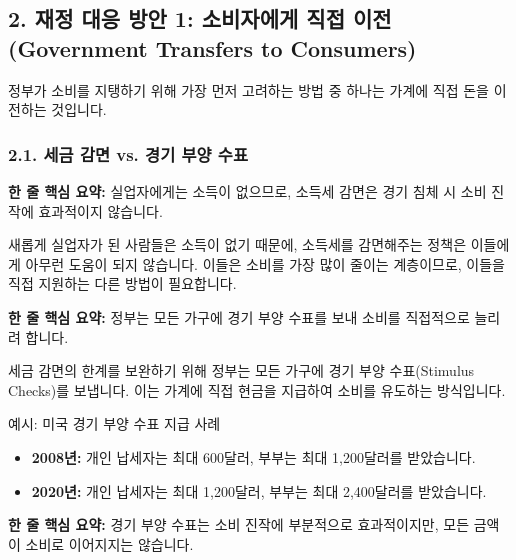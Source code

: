 \documentclass[11pt,a4paper]{article}
\begin{document}
\subsection*{2. 재정 대응 방안 1: 소비자에게 직접 이전 (Government Transfers to Consumers)}

정부가 소비를 지탱하기 위해 가장 먼저 고려하는 방법 중 하나는 가계에 직접 돈을 이전하는 것입니다.

\subsubsection*{2.1. 세금 감면 vs. 경기 부양 수표}

\begin{tcolorbox}[mybox={세금 감면의 한계}]
    \textbf{한 줄 핵심 요약:} 실업자에게는 소득이 없으므로, 소득세 감면은 경기 침체 시 소비 진작에 효과적이지 않습니다.
\end{tcolorbox}

새롭게 실업자가 된 사람들은 소득이 없기 때문에, 소득세를 감면해주는 정책은 이들에게 아무런 도움이 되지 않습니다. 이들은 소비를 가장 많이 줄이는 계층이므로, 이들을 직접 지원하는 다른 방법이 필요합니다.

\begin{tcolorbox}[mybox={경기 부양 수표의 도입}]
    \textbf{한 줄 핵심 요약:} 정부는 모든 가구에 경기 부양 수표를 보내 소비를 직접적으로 늘리려 합니다.
\end{tcolorbox}

세금 감면의 한계를 보완하기 위해 정부는 모든 가구에 경기 부양 수표(Stimulus Checks)를 보냅니다. 이는 가계에 직접 현금을 지급하여 소비를 유도하는 방식입니다.

\begin{examplebox}{예시: 미국 경기 부양 수표 지급 사례}
    \begin{itemize}
        \item \textbf{2008년:} 개인 납세자는 최대 600달러, 부부는 최대 1,200달러를 받았습니다.
        \item \textbf{2020년:} 개인 납세자는 최대 1,200달러, 부부는 최대 2,400달러를 받았습니다.
    \end{itemize}
\end{examplebox}

\begin{tcolorbox}[mybox={경기 부양 수표의 효과성}]
    \textbf{한 줄 핵심 요약:} 경기 부양 수표는 소비 진작에 부분적으로 효과적이지만, 모든 금액이 소비로 이어지지는 않습니다.
\end{tcolorbox}
\end{document}
